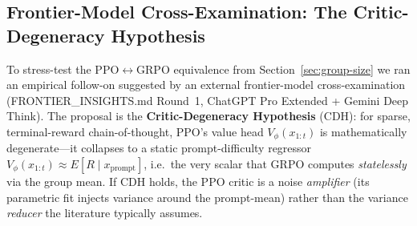 %
%

\subsection{Frontier-Model Cross-Examination: The Critic-Degeneracy Hypothesis}
\label{sec:frontier-critic-degeneracy}

To stress-test the PPO$\leftrightarrow$GRPO equivalence from
Section~\ref{sec:group-size} we ran an empirical follow-on suggested
by an external frontier-model cross-examination (FRONTIER\_INSIGHTS.md
Round~1, ChatGPT Pro Extended + Gemini Deep Think). The proposal is
the \textbf{Critic-Degeneracy Hypothesis} (CDH): for sparse,
terminal-reward chain-of-thought, PPO's value head
$V_\phi(x_{1:t})$ is mathematically degenerate---it collapses to a
static prompt-difficulty regressor
$V_\phi(x_{1:t}) \approx E[R \mid x_\text{prompt}]$, i.e.\ the very
scalar that GRPO computes \emph{statelessly} via the group mean. If
CDH holds, the PPO critic is a noise \emph{amplifier} (its parametric
fit injects variance around the prompt-mean) rather than the variance
\emph{reducer} the literature typically assumes.

